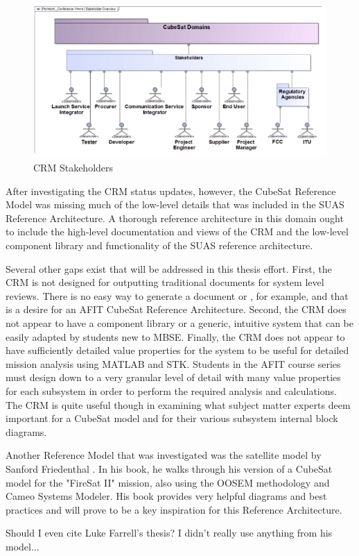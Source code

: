 \begin{figure}
    \centering
    \includegraphics[width=\textwidth]{Thesis/Literature_Review/Lit Review Figures/CubeSat Stakeholders.png}
    \caption{CRM Stakeholders}
    \label{fig:CRM Stakeholders}
\end{figure}

After investigating the CRM status updates, however, the CubeSat Reference Model was missing much of the low-level details that was included in the SUAS Reference Architecture. A thorough reference architecture in this domain ought to include the high-level documentation and views of the CRM and the low-level component library and functionality of the SUAS reference architecture. 

Several other gaps exist that will be addressed in this thesis effort. First, the CRM is not designed for outputting traditional documents for system level reviews. There is no easy way to generate a  document or , for example, and that is a desire for an AFIT CubeSat Reference Architecture. Second, the CRM does not appear to have a component library or a generic, intuitive system that can be easily adapted by students new to MBSE. Finally, the CRM does not appear to have sufficiently detailed value properties for the system to be useful for detailed mission analysis using MATLAB and STK. Students in the AFIT course series must design down to a very granular level of detail with many value properties for each subsystem in order to perform the required analysis and calculations. The CRM is quite useful though in examining what subject matter experts deem important for a CubeSat model and for their various subsystem internal block diagrams.

Another Reference Model that was investigated was the satellite model by Sanford Friedenthal \citep{FriedenthalArchitectingSpacecraft}. In his book, he walks through his version of a CubeSat model for the "FireSat II" mission, also using the OOSEM methodology and Cameo Systems Modeler. His book provides very helpful diagrams and best practices and will prove to be a key inspiration for this Reference Architecture. 

Should I even cite Luke Farrell's thesis? I didn't really use anything from his model...